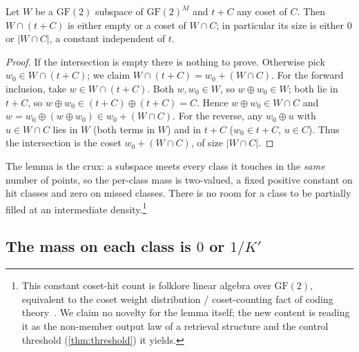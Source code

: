 \documentclass[acmsmall,review]{acmart}
\newcommand{\GF}{\mathrm{GF}(2)}
\newcommand{\W}{W}                          %
\newcommand{\inter}{\cap}
\begin{document}
\begin{lemma}
\label{lem:subspace-coset}
Let $\W$ be a $\GF$ subspace of $\GF^M$ and $t + C$ any coset of $C$. Then
$\W \inter (t + C)$ is either empty or a coset of $\W \inter C$; in particular its size
is either $0$ or $|\W \inter C|$, a constant independent of $t$.
\end{lemma}

\begin{proof}
If the intersection is empty there is nothing to prove. Otherwise pick
$w_0 \in \W \inter (t + C)$; we claim $\W \inter (t + C) = w_0 + (\W \inter C)$. For
the forward inclusion, take $w \in \W \inter (t + C)$. Both $w, w_0 \in \W$, so
$w \oplus w_0 \in \W$; both lie in $t + C$, so $w \oplus w_0 \in
(t+C) \oplus (t+C) = C$. Hence $w \oplus w_0 \in \W \inter C$ and
$w = w_0 \oplus (w \oplus w_0) \in w_0 + (\W \inter C)$. For the reverse, any
$w_0 \oplus u$ with $u \in \W \inter C$ lies in $\W$ (both terms in $\W$) and in
$t + C$ ($w_0 \in t+C$, $u \in C$). Thus the intersection is the coset
$w_0 + (\W \inter C)$, of size $|\W \inter C|$.
\end{proof}

The lemma is the crux: a subspace meets every class it touches in the \emph{same}
number of points, so the per-class mass is two-valued, a fixed positive constant on hit
classes and zero on missed classes. There is no room for a class to be partially filled
at an intermediate density.\footnote{This constant coset-hit count is folklore linear
algebra over $\GF$, equivalent to the coset weight distribution / coset-counting fact of
coding theory~\cite{macwilliams1977}. We claim no novelty for the lemma itself; the new
content is reading it as the non-member output law of a retrieval structure and the
control threshold (\cref{thm:threshold}) it yields.}

\subsection{\texorpdfstring{The mass on each class is $0$ or $1/K'$}{The mass on each class is 0 or 1/K'}}
\end{document}
